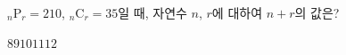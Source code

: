 \hspace*{2mm}\begin{minipage}[t]{\dimexpr\linewidth-2mm\relax}\vspace{0pt}
${}_n\mathrm{P}_r=210$, ${}_n\mathrm{C}_r=35$일 때, 자연수 $n$, $r$에 대하여 $n+r$의 값은?
\begin{choices32}{$8$}{$9$}{$10$}{$11$}{$12$}\end{choices32}\end{minipage}

